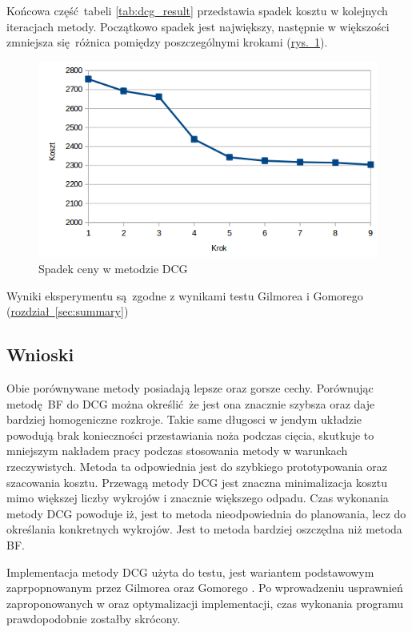 Końcowa część tabeli \ref{tab:dcg_result} przedstawia spadek kosztu w kolejnych iteracjach metody. Początkowo spadek jest największy, następnie w większości zmniejsza się różnica pomiędzy poszczególnymi krokami (\hyperref[fig:regression]{rys.~\ref*{fig:regression}}).

\begin{figure}[h]
  \includegraphics[width=\textwidth]{../image/dcg_regression.png}
  \caption{Spadek ceny w metodzie DCG}
  \label{fig:regression}
\end{figure}

Wyniki eksperymentu są zgodne z wynikami testu Gilmorea i Gomorego (\hyperref[sec:dcg]{rozdział~\ref*{sec:summary}})

\subsection{Wnioski}
Obie porównywane metody posiadają lepsze oraz gorsze cechy. Porównując metodę BF do DCG można określić że jest ona znacznie szybsza oraz daje bardziej homogeniczne rozkroje. Takie same długosci w jendym układzie powodują brak konieczności przestawiania noża podczas cięcia, skutkuje to mniejszym nakładem pracy podczas stosowania metody w warunkach rzeczywistych. Metoda ta odpowiednia jest do szybkiego prototypowania oraz szacowania kosztu. Przewagą metody DCG jest znaczna minimalizacja kosztu mimo większej liczby wykrojów i znacznie większego odpadu. Czas wykonania metody DCG powoduje iż, jest to metoda nieodpowiednia do planowania, lecz do określania konkretnych wykrojów. Jest to metoda bardziej oszczędna niż metoda BF.

Implementacja metody DCG użyta do testu, jest wariantem podstawowym zaprpopnowanym przez Gilmorea oraz Gomorego \cite{GilmoreGomoryV1Article}. Po wprowadzeniu usprawnień zaproponowanych w \cite{GilmoreGomoryV2Article} oraz optymalizacji implementacji, czas wykonania programu prawdopodobnie zostałby skrócony.
